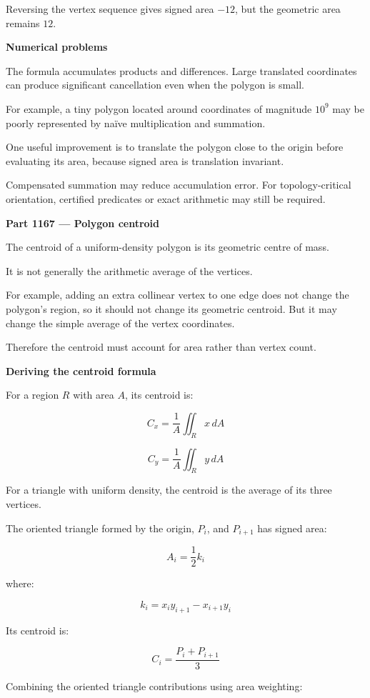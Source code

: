 Reversing the vertex sequence gives signed area \(-12\), but the geometric area remains \(12\).

\textbf{Numerical problems}

The formula accumulates products and differences. Large translated coordinates can produce significant cancellation even when the polygon is small.

For example, a tiny polygon located around coordinates of magnitude \(10^9\) may be poorly represented by naïve multiplication and summation.

One useful improvement is to translate the polygon close to the origin before evaluating its area, because signed area is translation invariant.

Compensated summation may reduce accumulation error. For topology-critical orientation, certified predicates or exact arithmetic may still be required.

\textbf{Part 1167 --- Polygon centroid}

The centroid of a uniform-density polygon is its geometric centre of mass.

It is not generally the arithmetic average of the vertices.

For example, adding an extra collinear vertex to one edge does not change the polygon's region, so it should not change its geometric centroid. But it may change the simple average of the vertex coordinates.

Therefore the centroid must account for area rather than vertex count.

\textbf{Deriving the centroid formula}

For a region \(R\) with area \(A\), its centroid is:

\[
C_x=\frac1A\iint_R x\,dA
\]

\[
C_y=\frac1A\iint_R y\,dA
\]

For a triangle with uniform density, the centroid is the average of its three vertices.

The oriented triangle formed by the origin, \(P_i\), and \(P_{i+1}\) has signed area:

\[
A_i=\frac12k_i
\]

where:

\[
k_i=x_iy_{i+1}-x_{i+1}y_i
\]

Its centroid is:

\[
C_i=\frac{P_i+P_{i+1}}3
\]

Combining the oriented triangle contributions using area weighting:


